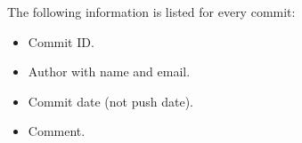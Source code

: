 The following information is listed for every commit:
\begin{itemize}
  \item Commit ID.
  \item Author with name and email.
  \item Commit date (not push date).
  \item Comment.
\end{itemize}

